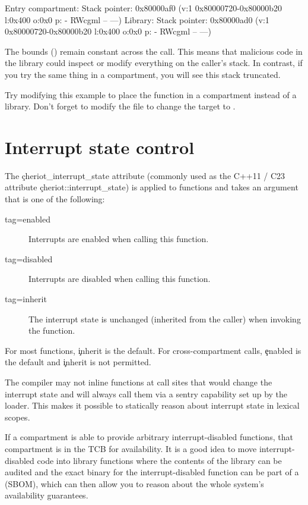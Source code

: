 {{\begin{console}
Entry compartment: Stack pointer: 0x80000af0 (v:1 0x80000720-0x80000b20 l:0x400 o:0x0 p: - RWcgml -- ---)
Library: Stack pointer: 0x80000ad0 (v:1 0x80000720-0x80000b20 l:0x400 o:0x0 p: - RWcgml -- ---)
\end{console}

The bounds () remain constant across the call.
This means that malicious code in the library could inspect or modify everything on the caller's stack.
In contrast, if you try the same thing in a compartment, you will see this stack truncated.

Try modifying this example to place the function in a compartment instead of a library.
Don't forget to modify the  file to change the  target to .

\section{Interrupt state control}

The \c{cheriot_interrupt_state} attribute (commonly used as the C++11 / C23 attribute \c{cheriot::interrupt_state}) is applied to functions and takes an argument that is one of the following:

\begin{description}
	\item[tag=enabled]{Interrupts are enabled when calling this function.}
	\item[tag=disabled]{Interrupts are disabled when calling this function.}
	\item[tag=inherit]{ The interrupt state is unchanged (inherited from the caller) when invoking the function.}
\end{description}

For most functions, \c{inherit} is the default.
For cross-compartment calls, \c{enabled} is the default and \c{inherit} is not permitted.

The compiler may not inline functions at call sites that would change the interrupt state and will always call them via a sentry capability set up by the loader.
This makes it possible to statically reason about interrupt state in lexical scopes.

\begin{caution}
If a compartment is able to provide arbitrary interrupt-disabled functions, that compartment is in the TCB for availability.
It is a good idea to move interrupt-disabled code into library functions where the contents of the library can be audited and the exact binary for the interrupt-disabled function can be part of a  (SBOM), which can then allow you to reason about the whole system's availability guarantees.
\end{caution}

}}
